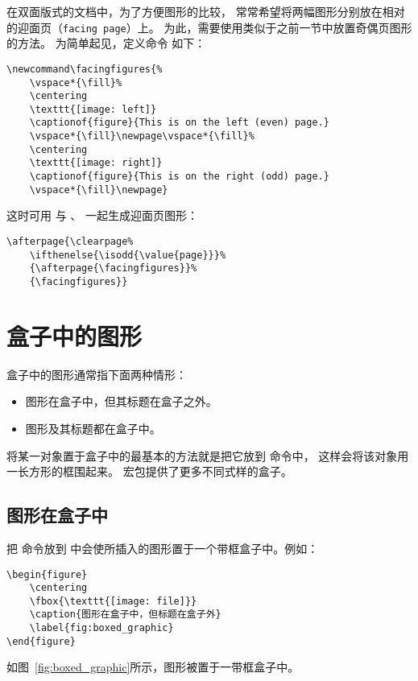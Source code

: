 在双面版式的文档中，为了方便图形的比较，
常常希望将两幅图形分别放在相对的迎面页（\texttt{facing page}）上。
为此，需要使用类似于之前一节中放置奇偶页图形的方法。
为简单起见，定义命令  如下：
\begin{lstlisting}
\newcommand\facingfigures{%
	\vspace*{\fill}%
	\centering
	\texttt{[image: left]}
	\captionof{figure}{This is on the left (even) page.}
	\vspace*{\fill}\newpage\vspace*{\fill}%
	\centering
	\texttt{[image: right]}
	\captionof{figure}{This is on the right (odd) page.}
	\vspace*{\fill}\newpage}
\end{lstlisting}

这时可用  与 、 一起生成迎面页图形：
\begin{lstlisting}
\afterpage{\clearpage%
	\ifthenelse{\isodd{\value{page}}}%
	{\afterpage{\facingfigures}}%
	{\facingfigures}}
\end{lstlisting}


\section{盒子中的图形}\label{sec:boxfig}

盒子中的图形通常指下面两种情形：
\begin{itemize}
	\item 图形在盒子中，但其标题在盒子之外。
	\item 图形及其标题都在盒子中。
\end{itemize}

将某一对象置于盒子中的最基本的方法就是把它放到  命令中，
这样会将该对象用一长方形的框围起来。
 宏包提供了更多不同式样的盒子。


\subsection{图形在盒子中}\label{ssec:boxgraphic}

把  命令放到  中会使所插入的图形置于一个带框盒子中。例如：
\begin{lstlisting}
\begin{figure}
	\centering
	\fbox{\texttt{[image: file]}}
	\caption{图形在盒子中，但标题在盒子外}
	\label{fig:boxed_graphic}
\end{figure}
\end{lstlisting}
如图~\ref{fig:boxed_graphic}所示，图形被置于一带框盒子中。

